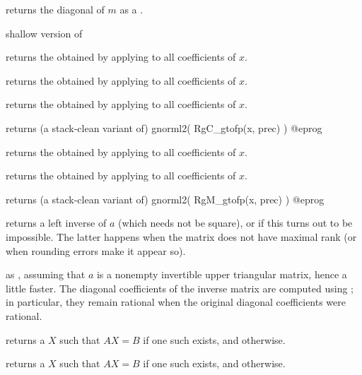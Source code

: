 returns the diagonal of $m$ as a .

 shallow version of 


 returns the  obtained by
applying  to all coefficients of $x$.

 returns the  obtained by
applying  to all coefficients of $x$.

 returns the  obtained by
applying  to all coefficients of $x$.

 returns (a stack-clean variant of)
\bprog
  gnorml2( RgC_gtofp(x, prec) )
@eprog

 returns the  obtained by
applying  to all coefficients of $x$.

 returns the  obtained by
applying  to all coefficients of $x$.

 returns (a stack-clean variant of)
\bprog
  gnorml2( RgM_gtofp(x, prec) )
@eprog


 returns a left inverse of $a$ (which needs not be
square), or  if this turns out to be impossible. The latter
happens when the matrix does not have maximal rank (or when rounding errors
make it appear so).

 as , assuming that $a$ is a
nonempty invertible upper triangular matrix, hence a little faster. The
diagonal coefficients of the inverse matrix are computed using
; in particular, they remain rational when
the original diagonal coefficients were rational.

 returns a  $X$ such that
$A X = B$ if one such exists, and  otherwise.

 returns a  $X$ such that
$A X = B$ if one such exists, and  otherwise.

